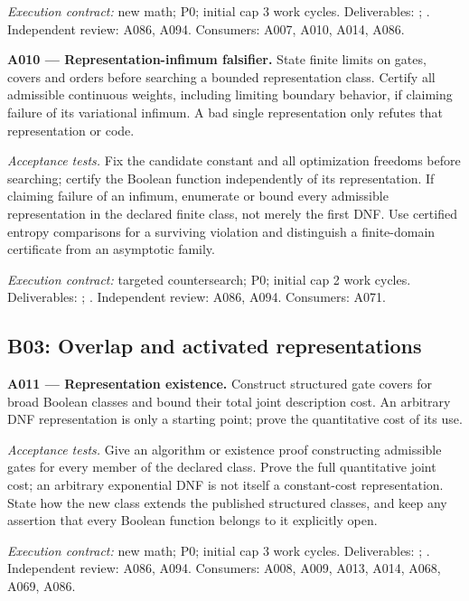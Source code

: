 \documentclass[11pt]{article}
\begin{document}
{\small\emph{Execution contract:} new math; P0; initial cap 3 work cycles. Deliverables: ; . Independent review: A086, A094. Consumers: A007, A010, A014, A086.}

\textbf{A010 --- Representation-infimum falsifier.} State finite limits on gates, covers and orders before searching a bounded representation class. Certify all admissible continuous weights, including limiting boundary behavior, if claiming failure of its variational infimum. A bad single representation only refutes that representation or code.

\emph{Acceptance tests.} Fix the candidate constant and all optimization freedoms before searching; certify the Boolean function independently of its representation. If claiming failure of an infimum, enumerate or bound every admissible representation in the declared finite class, not merely the first DNF. Use certified entropy comparisons for a surviving violation and distinguish a finite-domain certificate from an asymptotic family.

{\small\emph{Execution contract:} targeted countersearch; P0; initial cap 2 work cycles. Deliverables: ; . Independent review: A086, A094. Consumers: A071.}

\subsection{B03: Overlap and activated representations}

\textbf{A011 --- Representation existence.} Construct structured gate covers for broad Boolean classes and bound their total joint description cost. An arbitrary DNF representation is only a starting point; prove the quantitative cost of its use.

\emph{Acceptance tests.} Give an algorithm or existence proof constructing admissible gates for every member of the declared class. Prove the full quantitative joint cost; an arbitrary exponential DNF is not itself a constant-cost representation. State how the new class extends the published structured classes, and keep any assertion that every Boolean function belongs to it explicitly open.

{\small\emph{Execution contract:} new math; P0; initial cap 3 work cycles. Deliverables: ; . Independent review: A086, A094. Consumers: A008, A009, A013, A014, A068, A069, A086.}
\end{document}
